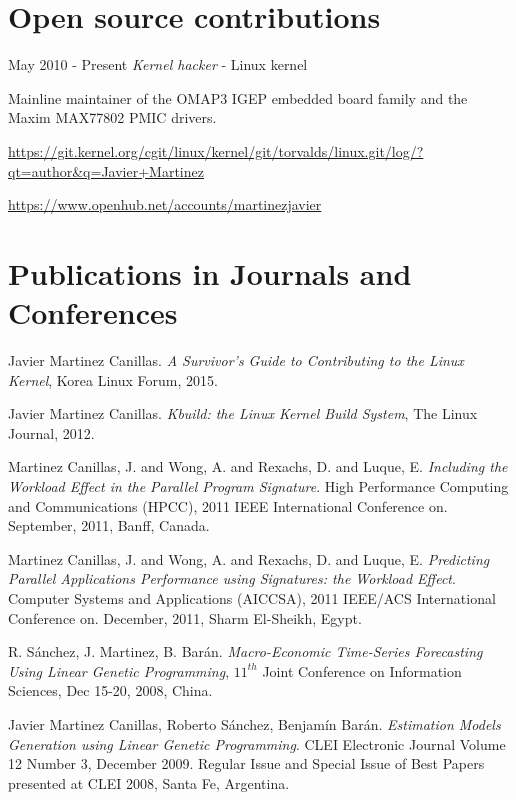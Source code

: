 \documentclass{simplecv}
\begin{document}
\section{Open source contributions}

\begin{topic}

\item[May 2010 - Present] \emph{Kernel hacker} - Linux kernel

Mainline maintainer of the OMAP3 IGEP embedded board family and the Maxim MAX77802 PMIC drivers.

\url{https://git.kernel.org/cgit/linux/kernel/git/torvalds/linux.git/log/?qt=author&q=Javier+Martinez}

\url{https://www.openhub.net/accounts/martinezjavier}

\end{topic}

\section{Publications in Journals and Conferences}

\begin{thebibliography}{10}

\footnotesize

Javier Martinez Canillas. \emph{A Survivor's Guide to Contributing to the Linux Kernel}, Korea Linux Forum, 2015.

Javier Martinez Canillas. \emph{Kbuild: the Linux Kernel Build System}, The Linux Journal, 2012. 

Martinez Canillas, J. and Wong, A. and Rexachs, D. and Luque, E. \emph{Including the Workload Effect in the Parallel Program Signature}. High Performance Computing and Communications (HPCC), 2011 IEEE International Conference on. September, 2011, Banff, Canada.

Martinez Canillas, J. and Wong, A. and Rexachs, D. and Luque, E. \emph{Predicting Parallel Applications Performance using Signatures: the Workload Effect}. Computer Systems and Applications (AICCSA), 2011 IEEE/ACS International Conference on. December, 2011, Sharm El-Sheikh, Egypt.

R. Sánchez, J. Martinez, B. Barán. \emph{Macro-Economic Time-Series Forecasting Using Linear Genetic Programming}, $11^{th}$ Joint Conference on Information Sciences, Dec 15-20, 2008, China. 

Javier Martinez Canillas, Roberto Sánchez, Benjamín Barán. \emph{Estimation Models Generation using Linear Genetic Programming}. CLEI Electronic Journal Volume 12 Number 3, December 2009. Regular Issue and Special Issue of Best Papers presented at CLEI 2008, Santa Fe, Argentina.

\end{thebibliography}
\end{document}
